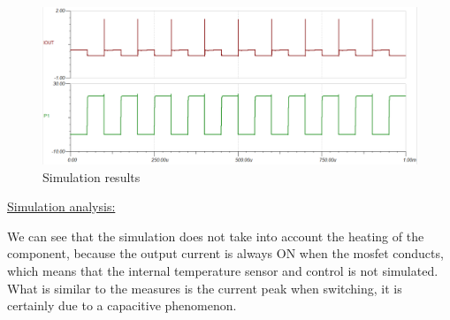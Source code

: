 {\begin{figure}[h]
	\centering
	\includegraphics[width=0.9\linewidth]{../../Simulations/Simu-Switching}
	\caption{Simulation results}
	\label{fig:simu-switching}
\end{figure}
\underline{Simulation analysis:}

We can see that the simulation does not take into account the heating of the component, because the output current is always ON when the mosfet conducts, which means that the internal temperature sensor and control is not simulated. What is similar to the measures is the current peak when switching, it is certainly due to a capacitive phenomenon. 


}

\clearpage

